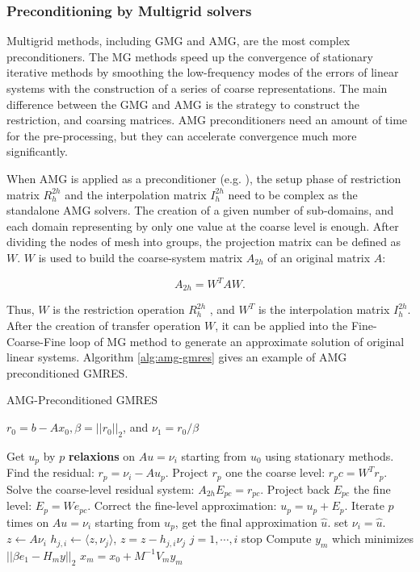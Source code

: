 \subsubsection{Preconditioning by Multigrid solvers}

Multigrid methods, including GMG and AMG, are the most complex preconditioners. The MG methods speed up the convergence of stationary iterative methods by smoothing the low-frequency modes of the errors of linear systems with the construction of a series of coarse representations. The main difference between the GMG and AMG is the strategy to construct the restriction, and coarsing matrices. AMG preconditioners need an amount of time for the pre-processing, but they can accelerate convergence much more significantly.

When AMG is applied as a preconditioner (e.g. \cite{plank2007algebraic,leem2004algebraic,yang2002boomeramg,mifune2003new}), the setup phase of restriction matrix $R_h^{2h}$ and the interpolation matrix $I_h^{2h}$ need to be complex as the standalone AMG solvers. The creation of a given number of sub-domains, and each domain representing by only one value at the coarse level is enough. After dividing the nodes of mesh into groups, the projection matrix can be defined as $W$. $W$ is used to build the coarse-system matrix $A_{2h}$ of an original matrix $A$:

\begin{equation}
A_{2h}=W^{T}AW.
\end{equation}

Thus, $W$ is the restriction operation $R_h^{2h}$ , and $W^{T}$ is the interpolation matrix $I_h^{2h}$. After the creation of transfer operation $W$, it can be applied into the Fine-Coarse-Fine loop of MG method to generate an approximate solution of original linear systems. Algorithm \ref{alg:amg-gmres} gives an example of AMG preconditioned GMRES.

\begin{algorithm}[htbp]
	\caption{AMG-Preconditioned GMRES}
	\label{alg:amg-gmres}
	\begin{algorithmic}[1]
		\State $r_0=b-A x_0, \beta=||r_0||_2$, and $\nu_1=r_0/\beta$
		
		\State Get $u_p$ by $p$ \textbf{relaxions} on $Au=\nu_i$ starting from $u_0$ using stationary methods.
		\State Find the residual: $r_p=\nu_i - Au_p$.
		\State Project $r_p$ one the coarse level: $r_pc=W^Tr_p$.
		\State Solve the coarse-level residual system: $A_{2h}E_{pc}=r_{pc}$.
		\State Project back $E_{pc}$ the fine level: $E_p = We_{pc}$.
		\State Correct the fine-level approximation: $u_p=u_p+E_p$.
		\State Iterate $p$ times on $Au=\nu_i$ starting from $u_p$, get the final approximation $\hat{u}$.
		\State set $\nu_i = \hat{u}$.
		\State $z \leftarrow A\nu_i$
		\State $h_{j,i} \leftarrow \langle z,\nu_j\rangle$, $z = z- h_{j,i}\nu_j$ $j=1,\cdots,i$
		\State stop
		\Else
		\EndIf
		\EndFor
		\State Compute $y_m$ which minimizes $||\beta e_1-H_m y||_2$ 
		\State $x_m=x_0+M^{-1}V_my_m$
	\end{algorithmic}
\end{algorithm}


